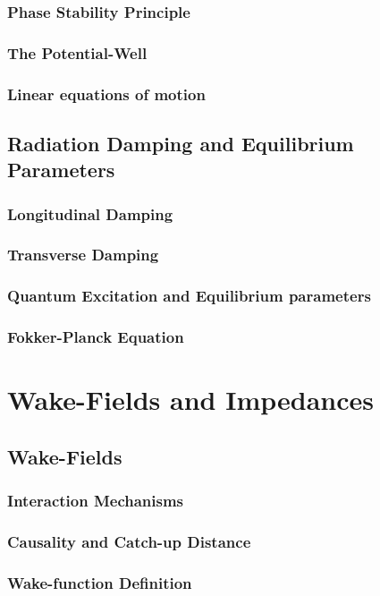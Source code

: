 \documentclass[
	12pt,				%
	openright,			%
	oneside,			%
	a4paper,		%
	chapter=TITLE,		%
	section=TITLE,		%
    brazil,				%
	english,			%
	sumario=tradicional,
	]{abntex2}
\begin{document}
    \subsection{Phase Stability Principle}
    \subsection{The Potential-Well}
    \subsection{Linear equations of motion}
  \section{Radiation Damping and Equilibrium Parameters}
    \subsection{Longitudinal Damping}
    \subsection{Transverse Damping}
    \subsection{Quantum Excitation and Equilibrium parameters}
    \subsection{Fokker-Planck Equation}

\chapter{Wake-Fields and Impedances}
  \section{Wake-Fields}
    \subsection{Interaction Mechanisms}
    \subsection{Causality and Catch-up Distance}
    \subsection{Wake-function Definition}
\end{document}
